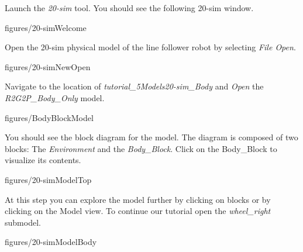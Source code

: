 \documentclass[11pt,a4paper]{../tutorial}
\begin{document}
\begin{instructions}

\item \label{step:exp3} Launch the \emph{20-sim} tool. You should see the following 20-sim window.

    \begin{annotation}[width=0.85\linewidth]{figures/20-simWelcome}
    \end{annotation}


\item Open the 20-sim physical model of the line follower robot by selecting \emph{File \menusep Open}.

     \begin{annotation}[width=0.8\linewidth, trim={0 12cm 0 0},clip]{figures/20-simNewOpen}
    \end{annotation}



\item \label{step:exp4} Navigate to the location of \emph{tutorial\_5\pathsep{}Models\pathsep{}20-sim\_Body} and \emph{Open} the \emph{R2G2P\_Body\_Only} model. 

    \begin{annotation}[width=0.4\linewidth]{figures/BodyBlockModel}
    \end{annotation}

\newpage

\item You should see the block diagram for the model. The diagram is composed of two blocks: The \emph{Environment} and the \emph{Body\_Block}. Click on the Body\_Block to visualize its contents.  

    \begin{annotation}[width=0.8\linewidth]{figures/20-simModelTop}
    \end{annotation}


\item At this step you can explore the model further by clicking on blocks or
	by clicking on the Model view. To continue our tutorial open the
	\emph{wheel\_right} submodel.

    \begin{annotation}[width=0.8\linewidth]{figures/20-simModelBody}
    \end{annotation}


\end{instructions}
\end{document}
